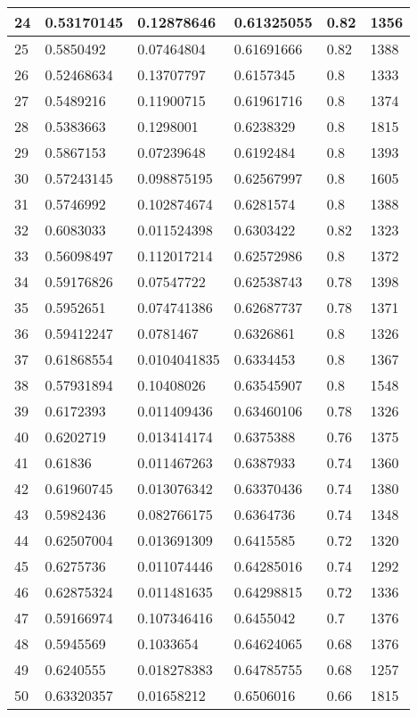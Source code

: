 \begin{longtable}{|l|l|l|l|l|l|}
24 & 0.53170145 & 0.12878646 & 0.61325055 & 0.82 & 1356 \\ \hline 
25 & 0.5850492 & 0.07464804 & 0.61691666 & 0.82 & 1388 \\ \hline 
26 & 0.52468634 & 0.13707797 & 0.6157345 & 0.8 & 1333 \\ \hline 
27 & 0.5489216 & 0.11900715 & 0.61961716 & 0.8 & 1374 \\ \hline 
28 & 0.5383663 & 0.1298001 & 0.6238329 & 0.8 & 1815 \\ \hline 
29 & 0.5867153 & 0.07239648 & 0.6192484 & 0.8 & 1393 \\ \hline 
30 & 0.57243145 & 0.098875195 & 0.62567997 & 0.8 & 1605 \\ \hline 
31 & 0.5746992 & 0.102874674 & 0.6281574 & 0.8 & 1388 \\ \hline 
32 & 0.6083033 & 0.011524398 & 0.6303422 & 0.82 & 1323 \\ \hline 
33 & 0.56098497 & 0.112017214 & 0.62572986 & 0.8 & 1372 \\ \hline 
34 & 0.59176826 & 0.07547722 & 0.62538743 & 0.78 & 1398 \\ \hline 
35 & 0.5952651 & 0.074741386 & 0.62687737 & 0.78 & 1371 \\ \hline 
36 & 0.59412247 & 0.0781467 & 0.6326861 & 0.8 & 1326 \\ \hline 
37 & 0.61868554 & 0.0104041835 & 0.6334453 & 0.8 & 1367 \\ \hline 
38 & 0.57931894 & 0.10408026 & 0.63545907 & 0.8 & 1548 \\ \hline 
39 & 0.6172393 & 0.011409436 & 0.63460106 & 0.78 & 1326 \\ \hline 
40 & 0.6202719 & 0.013414174 & 0.6375388 & 0.76 & 1375 \\ \hline 
41 & 0.61836 & 0.011467263 & 0.6387933 & 0.74 & 1360 \\ \hline 
42 & 0.61960745 & 0.013076342 & 0.63370436 & 0.74 & 1380 \\ \hline 
43 & 0.5982436 & 0.082766175 & 0.6364736 & 0.74 & 1348 \\ \hline 
44 & 0.62507004 & 0.013691309 & 0.6415585 & 0.72 & 1320 \\ \hline 
45 & 0.6275736 & 0.011074446 & 0.64285016 & 0.74 & 1292 \\ \hline 
46 & 0.62875324 & 0.011481635 & 0.64298815 & 0.72 & 1336 \\ \hline 
47 & 0.59166974 & 0.107346416 & 0.6455042 & 0.7 & 1376 \\ \hline 
48 & 0.5945569 & 0.1033654 & 0.64624065 & 0.68 & 1376 \\ \hline 
49 & 0.6240555 & 0.018278383 & 0.64785755 & 0.68 & 1257 \\ \hline 
50 & 0.63320357 & 0.01658212 & 0.6506016 & 0.66 & 1815 \\ \hline 
\end{longtable}